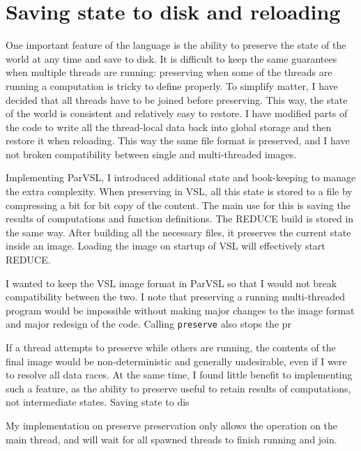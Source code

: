 \section{Saving state to disk and reloading}
\label{sec:preserve}

One important feature of the language is the ability to preserve the state of the world at any
time and save to disk. It is difficult to keep the same guarantees when multiple threads are running:
preserving when some of the threads are running a computation is tricky to define properly. To simplify
matter, I have decided that all threads have to be joined before preserving. This way, the state of
the world is consistent and relatively easy to restore. I have modified parts of the code to write
all the thread-local data back into global storage and then restore it when reloading. This way the same
file format is preserved, and I have not broken compatibility between single and multi-threaded images.

Implementing ParVSL, I introduced additional state and book-keeping to manage the extra complexity.
When preserving in VSL, all this state is stored to a file by compressing a bit for bit copy of the
content. The main use for this is saving the results of computations and function definitions.
The REDUCE build is stored in the same way. After building all the necessary files,
it preserves the current state inside an image. Loading the image on startup of VSL will effectively
start REDUCE.

I wanted to keep the VSL image format in ParVSL so that I would not break compatibility between the two.
I note that preserving a running multi-threaded program would be impossible without making major changes
to the image format and major redesign of the code. Calling \texttt{preserve} also stops the pr

 If a thread attempts to preserve while others
are running, the contents of the final image would be non-deterministic and generally undesirable,
even if I were to resolve all data races. At the same time, I found little benefit to implementing such
a feature, as the ability to preserve useful to retain results of computations, not intermediate states.
Saving state to dis

My implementation on preserve preservation only allows the operation on the main thread, and will wait
for all spawned threads to finish running and join.